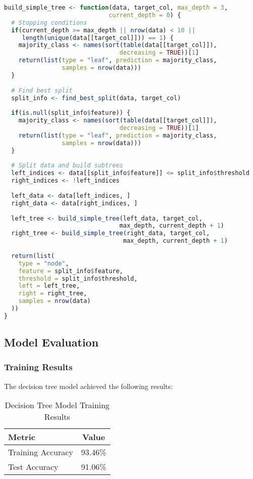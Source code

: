 \begin{lstlisting}[language=R, caption=Decision Tree Building Function]
build_simple_tree <- function(data, target_col, max_depth = 3, 
                             current_depth = 0) {
  # Stopping conditions
  if(current_depth >= max_depth || nrow(data) < 10 || 
     length(unique(data[[target_col]])) == 1) {
    majority_class <- names(sort(table(data[[target_col]]), 
                                decreasing = TRUE))[1]
    return(list(type = "leaf", prediction = majority_class, 
                samples = nrow(data)))
  }
  
  # Find best split
  split_info <- find_best_split(data, target_col)
  
  if(is.null(split_info$feature)) {
    majority_class <- names(sort(table(data[[target_col]]), 
                                decreasing = TRUE))[1]
    return(list(type = "leaf", prediction = majority_class, 
                samples = nrow(data)))
  }
  
  # Split data and build subtrees
  left_indices <- data[[split_info$feature]] <= split_info$threshold
  right_indices <- !left_indices
  
  left_data <- data[left_indices, ]
  right_data <- data[right_indices, ]
  
  left_tree <- build_simple_tree(left_data, target_col, 
                                max_depth, current_depth + 1)
  right_tree <- build_simple_tree(right_data, target_col, 
                                 max_depth, current_depth + 1)
  
  return(list(
    type = "node",
    feature = split_info$feature,
    threshold = split_info$threshold,
    left = left_tree,
    right = right_tree,
    samples = nrow(data)
  ))
}
\end{lstlisting}

\subsection{Model Evaluation}

\subsubsection{Training Results}

The decision tree model achieved the following results:

\begin{table}[h]
\centering
\caption{Decision Tree Model Training Results}
\begin{tabular}{|l|c|}
\hline
\textbf{Metric} & \textbf{Value} \\
\hline
Training Accuracy & 93.46\% \\
Test Accuracy & 91.06\% \\
\hline
\end{tabular}
\end{table}

